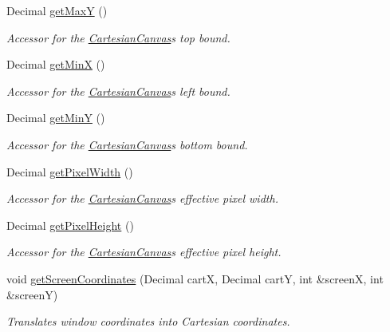 \begin{DoxyCompactItemize}
Decimal \hyperlink{classtsgl_1_1_cartesian_canvas_a68c0616f8180690423d39e9e83045b8c}{get\+Max\+Y} ()
\begin{DoxyCompactList}\small\item\em Accessor for the \hyperlink{classtsgl_1_1_cartesian_canvas}{Cartesian\+Canvas}\textquotesingle{}s top bound. \end{DoxyCompactList}\item 
Decimal \hyperlink{classtsgl_1_1_cartesian_canvas_a4ab031c60f6fed675e8163c30c01e5d6}{get\+Min\+X} ()
\begin{DoxyCompactList}\small\item\em Accessor for the \hyperlink{classtsgl_1_1_cartesian_canvas}{Cartesian\+Canvas}\textquotesingle{}s left bound. \end{DoxyCompactList}\item 
Decimal \hyperlink{classtsgl_1_1_cartesian_canvas_a99c935c99c9a29f2cc918963d734d9a6}{get\+Min\+Y} ()
\begin{DoxyCompactList}\small\item\em Accessor for the \hyperlink{classtsgl_1_1_cartesian_canvas}{Cartesian\+Canvas}\textquotesingle{}s bottom bound. \end{DoxyCompactList}\item 
Decimal \hyperlink{classtsgl_1_1_cartesian_canvas_ac9bb990b8c34a1575bcb861e4b819372}{get\+Pixel\+Width} ()
\begin{DoxyCompactList}\small\item\em Accessor for the \hyperlink{classtsgl_1_1_cartesian_canvas}{Cartesian\+Canvas}\textquotesingle{}s effective pixel width. \end{DoxyCompactList}\item 
Decimal \hyperlink{classtsgl_1_1_cartesian_canvas_a699c2b41b3b46bfac8649fb38b24c901}{get\+Pixel\+Height} ()
\begin{DoxyCompactList}\small\item\em Accessor for the \hyperlink{classtsgl_1_1_cartesian_canvas}{Cartesian\+Canvas}\textquotesingle{}s effective pixel height. \end{DoxyCompactList}\item 
void \hyperlink{classtsgl_1_1_cartesian_canvas_a8fea34cfcee9bc577c1e1ab6d28a8185}{get\+Screen\+Coordinates} (Decimal cart\+X, Decimal cart\+Y, int \&screen\+X, int \&screen\+Y)
\begin{DoxyCompactList}\small\item\em Translates window coordinates into Cartesian coordinates. \end{DoxyCompactList}\item 

\end{DoxyCompactItemize}
